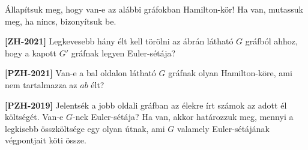 \documentclass[a4paper,12pt]{article}
\begin{document}
        \noindent{}
        \noindent{}
        \begin{enumerate}

            \item Állapítsuk meg, hogy van-e az alábbi gráfokban Hamilton-kör! Ha van, mutassuk meg, ha nincs, bizonyítsuk be.
            \begin{figure}[!h]
                \centering
                \begin{subfigure}{0.3\textwidth}
                    \centering
                    
                \end{subfigure}
                \begin{subfigure}{0.3\textwidth}
                    \centering
                    
                \end{subfigure}
            \end{figure}

            \begin{minipage}{0.45\textwidth}
                \centering
                
            \end{minipage}
            \begin{minipage}{0.5\textwidth}    
                \item \textbf{[ZH-2021]} Legkevesebb hány élt kell törölni az ábrán látható $G$ gráfból ahhoz, hogy a kapott $G'$ gráfnak legyen Euler-sétája?
                \item \textbf{[PZH-2021]} Van-e a bal oldalon látható $G$ gráfnak olyan Hamilton-köre, ami nem tartalmazza az $ab$ élt?
            \end{minipage}

            \begin{minipage}{0.6\textwidth}
                \item \textbf{[PZH-2019]} Jelentsék a jobb oldali gráfban az élekre írt számok az adott él költségét. Van-e $G$-nek Euler-sétája? Ha van, akkor határozzuk meg, mennyi a legkisebb összköltsége egy olyan útnak, ami $G$ valamely Euler-sétájának végpontjait köti össze.
            \end{minipage}
            \begin{minipage}{0.3\textwidth}
                \centering
                
            \end{minipage}


\end{enumerate}
\end{document}
